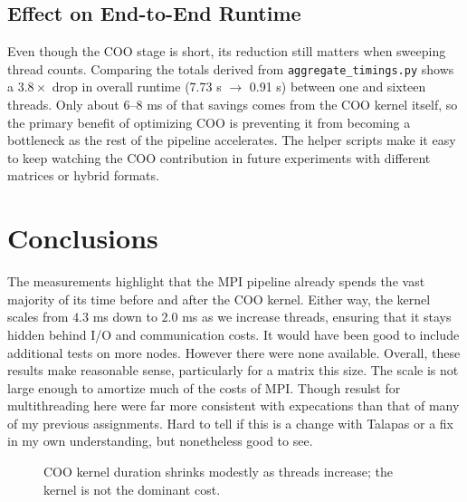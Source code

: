 \documentclass[11pt]{article}
\begin{document}
\subsection{Effect on End-to-End Runtime}
Even though the COO stage is short, its reduction still matters when sweeping thread counts. Comparing the totals derived from \texttt{aggregate\_timings.py} shows a $3.8\times$ drop in overall runtime (7.73 s $\rightarrow$ 0.91 s) between one and sixteen threads. Only about 6--8 ms of that savings comes from the COO kernel itself, so the primary benefit of optimizing COO is preventing it from becoming a bottleneck as the rest of the pipeline accelerates. The helper scripts make it easy to keep watching the COO contribution in future experiments with different matrices or hybrid formats.

\section{Conclusions}
The measurements highlight that the MPI pipeline already spends the vast majority of its time before and after the COO kernel. Either way, the kernel scales from $4.3$ ms down to $2.0$ ms as we increase threads, ensuring that it stays hidden behind I/O and communication costs. It would have been good to include additional tests on more nodes. However there were none available. Overall, these results make reasonable sense, particularly for a matrix this size. The scale is not large enough to amortize much of the costs of MPI. Though resulst for multithreading here were far more consistent with expecations than that of many of my previous assignments. Hard to tell if this is a change with Talapas or a fix in my own understanding, but nonetheless good to see.

\begin{figure}[t]
  \centering
  \caption{COO kernel duration shrinks modestly as threads increase; the kernel is not the dominant cost.}
  \label{fig:coo_line}
\end{figure}
\end{document}

